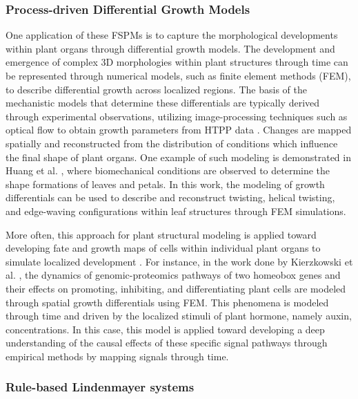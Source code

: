 \documentclass{article}
\begin{document}
\subsubsection{Process-driven Differential Growth Models}
One application of these FSPMs is to capture the morphological developments within plant organs through differential growth models. The development and emergence of complex 3D morphologies within plant structures through time can be represented through numerical models, such as finite element methods (FEM), to describe differential growth across localized regions. The basis of the mechanistic models that determine these differentials are typically derived through experimental observations, utilizing image-processing techniques such as optical flow to obtain growth parameters from HTPP data \cite{10.3389/fpls.2019.00227}. Changes are mapped spatially and reconstructed from the distribution of conditions which influence the final shape of plant organs. One example of such modeling is demonstrated in Huang et al. \cite{huang2018differential}, where biomechanical conditions are observed to determine the shape formations of leaves and petals. In this work, the modeling of growth differentials can be used to describe and reconstruct twisting, helical twisting, and edge-waving configurations within leaf structures through FEM simulations.

More often, this approach for plant structural modeling is applied toward developing fate and growth maps of cells within individual plant organs to simulate localized development \cite{Mosca2018}. For instance, in the work done by Kierzkowski et al. \cite{KIERZKOWSKI20191405}, the dynamics of genomic-proteomics pathways of two homeobox genes and their effects on promoting, inhibiting, and differentiating plant cells are modeled through spatial growth differentials using FEM. This phenomena is modeled through time and driven by the localized stimuli of plant hormone, namely auxin, concentrations. In this case, this model is applied toward developing a deep understanding of the causal effects of these specific signal pathways through empirical methods by mapping signals through time.

\subsubsection{Rule-based Lindenmayer systems}
\end{document}
